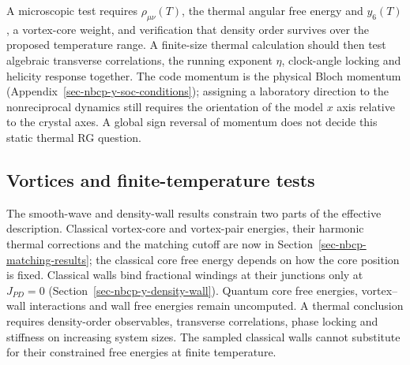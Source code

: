 A microscopic test requires \(\rho_{\mu\nu}(T)\), the thermal angular
free energy and \(y_6(T)\), a vortex-core weight, and verification that
density order survives over the proposed temperature range. A
finite-size thermal calculation should then test algebraic transverse
correlations, the running exponent \(\eta\), clock-angle locking and
helicity response together. The code momentum is the physical Bloch
momentum (Appendix~\ref{sec-nbcp-y-soc-conditions}); assigning a
laboratory direction to the nonreciprocal dynamics still requires the
orientation of the model \(x\) axis relative to the crystal axes. A
global sign reversal of momentum does not decide this static thermal RG
question.

\enlargethispage{\baselineskip}
\subsection{Vortices and finite-temperature
tests}\label{vortices-and-finite-temperature-tests}

The smooth-wave and density-wall results constrain two parts of the
effective description. Classical vortex-core and vortex-pair energies,
their harmonic thermal corrections and the matching cutoff are now in
Section~\ref{sec-nbcp-matching-results}; the classical core free energy
depends on how the core position is fixed. Classical walls bind fractional
windings at their junctions only at \(J_{PD}=0\)
(Section~\ref{sec-nbcp-y-density-wall}). Quantum core free energies,
vortex--wall interactions and wall free energies remain uncomputed. A thermal conclusion
requires density-order observables, transverse correlations, phase
locking and stiffness on increasing system sizes. The sampled classical
walls cannot substitute for their constrained free energies at finite
temperature.
